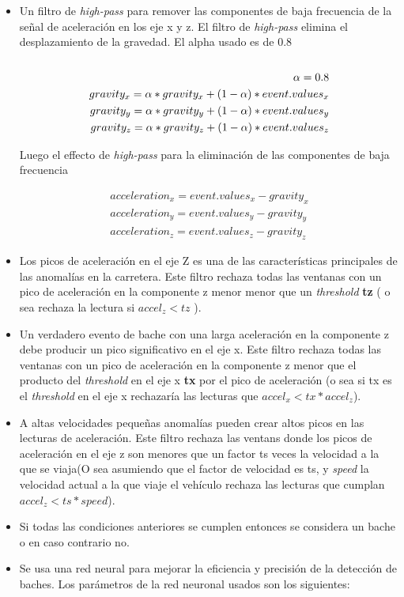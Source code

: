 		\begin{itemize}
			\item  Un filtro de \emph{high-pass} para remover las componentes de baja frecuencia de la señal de aceleración en los eje x y z.  El
				filtro de \emph{high-pass} elimina el desplazamiento de la gravedad. El alpha usado es de 0.8 \\\\
			\begin{align*}
				\alpha = 0.8 \\
				gravity_{x} = \alpha * gravity_x + (1-\alpha) *event.values_{x} \notag\\
				gravity_{y} = \alpha * gravity_y + (1-\alpha) *event.values_{y} \notag\\
				gravity_{z} = \alpha * gravity_z + (1-\alpha) *event.values_{z} \notag\\	
			\end{align*}
					
			Luego el effecto de \emph{high-pass} para la eliminación de las componentes de baja frecuencia
			
			\begin{align*}
				acceleration_{x} =  event.values_{x} - gravity_{x}\\
				acceleration_{y} = event.values_{y} - gravity_{y}\\
				acceleration_{z} = event.values_{z} - gravity_{z}
			\end{align*}

			\item Los picos de aceleración en el eje Z es una de las características principales de las anomalías en la carretera. Este filtro rechaza
				todas las ventanas con un pico de aceleración en la componente z menor menor que un \emph{threshold} \textbf{tz} ( o sea rechaza la
				lectura si $accel_z < tz$ ). \item Un verdadero evento de bache con una larga aceleración en la componente z debe producir un pico
				significativo en el eje x. Este filtro rechaza todas las ventanas con un pico de aceleración en la componente z menor que  el producto
				del \emph{threshold} en el eje x \textbf{tx} por  el pico de aceleración (o sea si tx es el \emph{threshold} en el eje x rechazaría las
				lecturas que $accel_x < tx * accel_z$). \item A altas velocidades pequeñas anomalías pueden crear altos picos en las lecturas de
				aceleración. Este filtro rechaza las ventans donde los picos de aceleración en el eje z son menores que un factor ts veces la velocidad
				a la que se viaja(O sea asumiendo que el factor de velocidad es ts, y \emph{speed} la velocidad actual a la que viaje el vehículo rechaza
				las lecturas que cumplan $accel_z < ts * speed$). \item  Si todas las condiciones anteriores se cumplen entonces se considera un bache o
				en caso contrario no. \item  Se usa una red neural para mejorar la eficiencia y precisión de la detección de baches. Los parámetros de
				la red neuronal usados son los siguientes:\\


\end{itemize}

